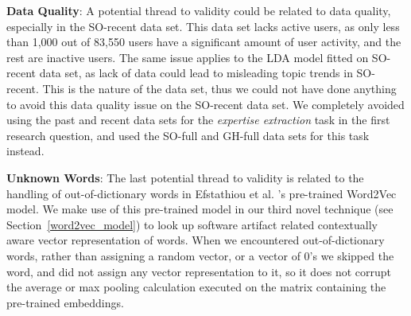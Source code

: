         \textbf{Data Quality}: A potential thread to validity could be related to data quality, especially in the SO-recent data set. This data set lacks active users, as only less than 1,000 out of 83,550 users have a significant amount of user activity, and the rest are inactive users. The same issue applies to the LDA model fitted on SO-recent data set, as lack of data could lead to misleading topic trends in SO-recent. This is the nature of the data set, thus we could not have done anything to avoid this data quality issue on the SO-recent data set. We completely avoided using the past and recent data sets for the \emph{expertise extraction} task in the first research question, and used the SO-full and GH-full data sets for this task instead.
        
        \textbf{Unknown Words}: The last potential thread to validity is related to the handling of out-of-dictionary words in Efstathiou et al. \cite{efstathiou2018word}'s pre-trained Word2Vec model. We make use of this pre-trained model in our third novel technique (see Section~\ref{word2vec_model}) to look up software artifact related contextually aware vector representation of words. When we encountered out-of-dictionary words, rather than assigning a random vector, or a vector of 0's we skipped the word, and did not assign any vector representation to it, so it does not corrupt the average or max pooling calculation executed on the matrix containing the pre-trained embeddings. 
        
        

